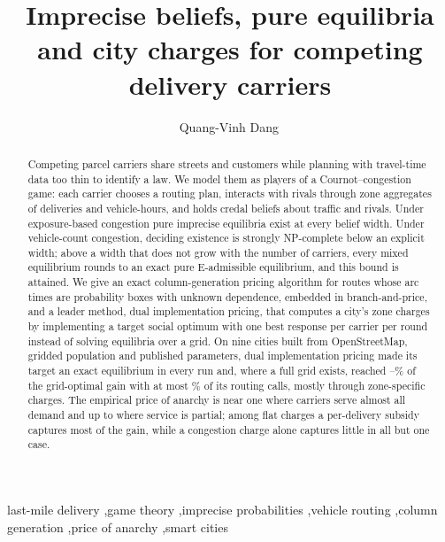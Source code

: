 \documentclass[preprint,12pt]{elsarticle}
\theoremstyle{definition}
\theoremstyle{remark}
\begin{document}
\begin{frontmatter}

\title{Imprecise beliefs, pure equilibria and city charges for competing delivery carriers}

\author{Quang-Vinh Dang\,}
\address{British University Vietnam, Hung Yen, Vietnam}

\begin{abstract}
Competing parcel carriers share streets and customers while planning with travel-time data too thin to identify a law. We model them as players of a Cournot--congestion game: each carrier chooses a routing plan, interacts with rivals through zone aggregates of deliveries and vehicle-hours, and holds credal beliefs about traffic and rivals. Under exposure-based congestion pure imprecise equilibria exist at every belief width. Under vehicle-count congestion, deciding existence is strongly NP-complete below an explicit width; above a width that does not grow with the number of carriers, every mixed equilibrium rounds to an exact pure E-admissible equilibrium, and this bound is attained. We give an exact column-generation pricing algorithm for routes whose arc times are probability boxes with unknown dependence, embedded in branch-and-price, and a leader method, dual implementation pricing, that computes a city's zone charges by implementing a target social optimum with one best response per carrier per round instead of solving equilibria over a grid. On nine cities built from OpenStreetMap, gridded population and published parameters, dual implementation pricing made its target an exact equilibrium in every run and, where a full grid exists, reached \DipFullGainMin--\DipFullGainMax\% of the grid-optimal gain with at most \DipFullCallsMax\% of its routing calls, mostly through zone-specific charges. The empirical price of anarchy is near one where carriers serve almost all demand and up to \PoALondonMax{} where service is partial; among flat charges a per-delivery subsidy captures most of the gain, while a congestion charge alone captures little in all but one case.
\end{abstract}

\begin{keyword}
last-mile delivery \sep game theory \sep imprecise probabilities \sep vehicle routing \sep column generation \sep price of anarchy \sep smart cities
\end{keyword}

\end{frontmatter}
\end{document}

